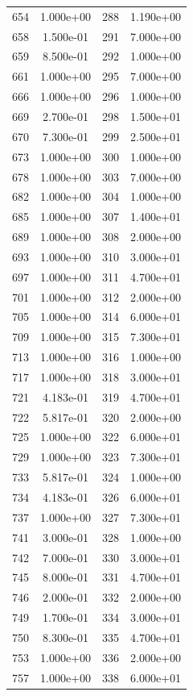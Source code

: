 \documentclass[12pt]{article}
\begin{document}
\begin{longtable}{@{}cccc@{}}
654 & 1.000e+00 & 288 & 1.190e+00 \\
658 & 1.500e-01 & 291 & 7.000e+00 \\
659 & 8.500e-01 & 292 & 1.000e+00 \\
661 & 1.000e+00 & 295 & 7.000e+00 \\
666 & 1.000e+00 & 296 & 1.000e+00 \\
669 & 2.700e-01 & 298 & 1.500e+01 \\
670 & 7.300e-01 & 299 & 2.500e+01 \\
673 & 1.000e+00 & 300 & 1.000e+00 \\
678 & 1.000e+00 & 303 & 7.000e+00 \\
682 & 1.000e+00 & 304 & 1.000e+00 \\
685 & 1.000e+00 & 307 & 1.400e+01 \\
689 & 1.000e+00 & 308 & 2.000e+00 \\
693 & 1.000e+00 & 310 & 3.000e+01 \\
697 & 1.000e+00 & 311 & 4.700e+01 \\
701 & 1.000e+00 & 312 & 2.000e+00 \\
705 & 1.000e+00 & 314 & 6.000e+01 \\
709 & 1.000e+00 & 315 & 7.300e+01 \\
713 & 1.000e+00 & 316 & 1.000e+00 \\
717 & 1.000e+00 & 318 & 3.000e+01 \\
721 & 4.183e-01 & 319 & 4.700e+01 \\
722 & 5.817e-01 & 320 & 2.000e+00 \\
725 & 1.000e+00 & 322 & 6.000e+01 \\
729 & 1.000e+00 & 323 & 7.300e+01 \\
733 & 5.817e-01 & 324 & 1.000e+00 \\
734 & 4.183e-01 & 326 & 6.000e+01 \\
737 & 1.000e+00 & 327 & 7.300e+01 \\
741 & 3.000e-01 & 328 & 1.000e+00 \\
742 & 7.000e-01 & 330 & 3.000e+01 \\
745 & 8.000e-01 & 331 & 4.700e+01 \\
746 & 2.000e-01 & 332 & 2.000e+00 \\
749 & 1.700e-01 & 334 & 3.000e+01 \\
750 & 8.300e-01 & 335 & 4.700e+01 \\
753 & 1.000e+00 & 336 & 2.000e+00 \\
757 & 1.000e+00 & 338 & 6.000e+01 \\

\end{longtable}
\end{document}
